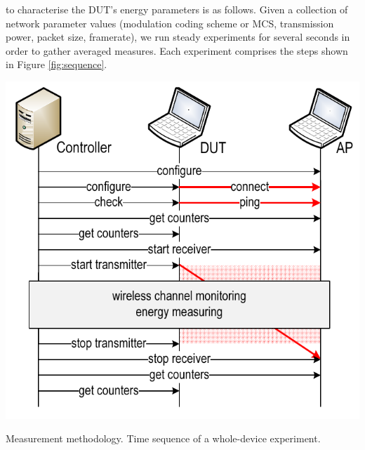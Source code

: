 \documentclass[twoside,nohyper]{tufte-book}
\theoremstyle{definition}
\theoremstyle{definition}
\theoremstyle{definition}
\theoremstyle{remark}
\begin{document}
 to characterise the DUT's
energy parameters is as follows. Given a collection of network parameter
values (modulation coding scheme or MCS, transmission power, packet
size, framerate), we run steady experiments for several seconds in order
to gather averaged measures. Each experiment comprises the steps shown
in Figure \ref{fig:sequence}.




\begin{marginfigure}

{\centering \includegraphics[width=1\linewidth]{img/03/sequence} 

}

\caption[Measurement methodology. Time sequence of a whole-device
experiment.]{Measurement methodology. Time sequence of a whole-device
experiment.}\label{fig:sequence}
\end{marginfigure}
\end{document}
